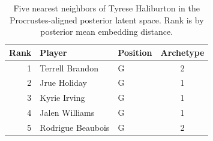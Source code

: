\begin{table}[htbp]
  \centering\small
  \begin{tabular}{rllc}
    \toprule
    Rank & Player & Position & Archetype \\
    \midrule
    1 & Terrell Brandon & G & 2 \\
    2 & Jrue Holiday & G & 1 \\
    3 & Kyrie Irving & G & 1 \\
    4 & Jalen Williams & G & 1 \\
    5 & Rodrigue Beaubois & G & 2 \\
    \bottomrule
  \end{tabular}
  \caption{Five nearest neighbors of Tyrese Haliburton in the Procrustes-aligned posterior latent space. Rank is by posterior mean embedding distance.}
  \label{tab:Tyrese_Haliburton_neighbors}
\end{table}

